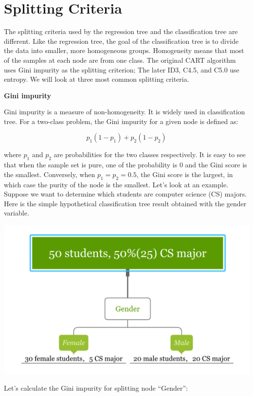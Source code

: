 \documentclass[12pt,]{krantz}
\begin{document}
\hypertarget{splitting-criteria}{%
\section{Splitting Criteria}\label{splitting-criteria}}

The splitting criteria used by the regression tree and the classification tree are different. Like the regression tree, the goal of the classification tree is to divide the data into smaller, more homogeneous groups. Homogeneity means that most of the samples at each node are from one class. The original CART algorithm uses Gini impurity as the splitting criterion; The later ID3, C4.5, and C5.0 use entropy. We will look at three most common splitting criteria.

\textbf{Gini impurity}

Gini impurity\citep{Breiman1984} is a measure of non-homogeneity. It is widely used in classification tree. For a two-class problem, the Gini impurity for a given node is defined as:

\[p_{1}(1-p_{1})+p_{2}(1-p_{2})\]

where \(p_{1}\) and \(p_{2}\) are probabilities for the two classes respectively. It is easy to see that when the sample set is pure, one of the probability is 0 and the Gini score is the smallest. Conversely, when \(p_{1}=p_{2}=0.5\), the Gini score is the largest, in which case the purity of the node is the smallest. Let's look at an example. Suppose we want to determine which students are computer science (CS) majors. Here is the simple hypothetical classification tree result obtained with the gender variable.

\includegraphics{images/giniEN.PNG}

Let's calculate the Gini impurity for splitting node ``Gender'':
\end{document}
